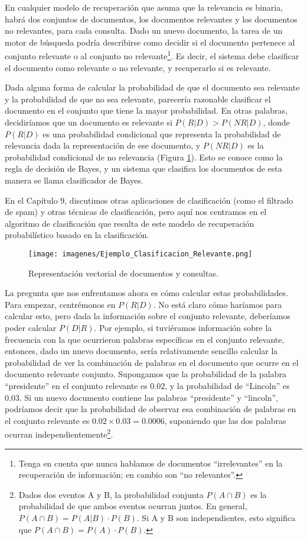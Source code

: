En cualquier modelo de recuperación que asuma que la relevancia es binaria, habrá dos conjuntos de documentos, los documentos relevantes y los documentos no relevantes, para cada consulta. Dado un nuevo documento, la tarea de un motor de búsqueda podría describirse como decidir si el documento pertenece al conjunto relevante o al conjunto no relevante\footnote{Tenga en cuenta que nunca hablamos de documentos ``irrelevantes'' en la recuperación de información; en cambio son ``no relevantes''.}. Es decir, el sistema debe clasificar el documento como relevante o no relevante, y recuperarlo si es relevante.

Dada alguna forma de calcular la probabilidad de que el documento sea relevante y la probabilidad de que no sea relevante, parecería razonable clasificar el documento en el conjunto que tiene la mayor probabilidad. En otras palabras, decidiríamos que un documento es relevante si $P (R | D)> P (NR | D)$, donde $P (R | D)$ es una probabilidad condicional que representa la probabilidad de relevancia dada la representación de ese documento, y $P (NR | D)$ es la probabilidad condicional de no relevancia (Figura \ref{fig:Ejemplo_Clasificacion_Relevante}). Esto se conoce como la regla de decisión de Bayes, y un sistema que clasifica los documentos de esta manera se llama clasificador de Bayes.

En el Capítulo 9, discutimos otras aplicaciones de clasificación (como el filtrado de spam) y otras técnicas de clasificación, pero aquí nos centramos en el algoritmo de clasificación que resulta de este modelo de recuperación probabilístico basado en la clasificación.

\begin{figure}[h!]
	\centering
	\texttt{[image: imagenes/Ejemplo\_Clasificacion\_Relevante.png]}
	\caption{\label{fig:Ejemplo_Clasificacion_Relevante}Representación vectorial de documentos y consultas.}
\end{figure}

La pregunta que nos enfrentamos ahora es cómo calcular estas probabilidades. Para empezar, centrémonos en $P (R | D)$. No está claro cómo haríamos para calcular esto, pero dada la información sobre el conjunto relevante, deberíamos poder calcular $P (D | R)$. Por ejemplo, si tuviéramos información sobre la frecuencia con la que ocurrieron palabras específicas en el conjunto relevante, entonces, dado un nuevo documento, sería relativamente sencillo calcular la probabilidad de ver la combinación de palabras en el documento que ocurre en el documento relevante conjunto. Supongamos que la probabilidad de la palabra ``presidente'' en el conjunto relevante es $0.02$, y la probabilidad de ``Lincoln'' es $0.03$. Si un nuevo documento contiene las palabras ``presidente'' y ``lincoln'', podríamos decir que la probabilidad de observar esa combinación de palabras en el conjunto relevante es $0.02 \times 0.03 = 0.0006$, suponiendo que las dos palabras ocurran independientemente\footnote{Dados dos eventos A y B, la probabilidad conjunta $P (A \cap B)$ es la probabilidad de que ambos eventos ocurran juntos. En general, $P (A \cap B) = P (A | B)\cdot P (B)$. Si A y B son independientes, esto significa que $P (A \cap B) = P (A)\cdot P (B)$.}.

